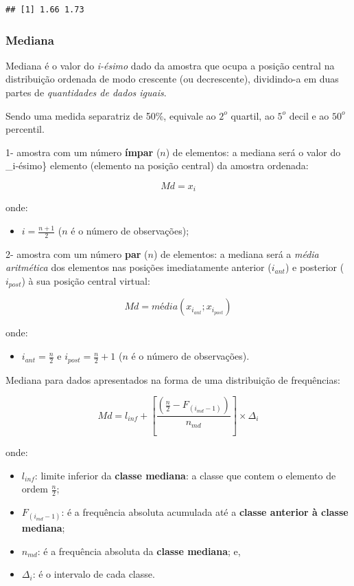 \documentclass[
]{book}
\providecommand{\tightlist}{%
  \setlength{\itemsep}{0pt}\setlength{\parskip}{0pt}}
\begin{document}
\begin{verbatim}
## [1] 1.66 1.73
\end{verbatim}

\hypertarget{mediana}{%
\subsubsection{Mediana}\label{mediana}}

Mediana é o valor do \emph{i-ésimo} dado da amostra que ocupa a posição central na distribuição ordenada de modo crescente (ou decrescente), dividindo-a em duas partes de \emph{quantidades de dados iguais}.

Sendo uma medida separatriz de 50\%, equivale ao \(2^{o}\) quartil, ao \(5^{o}\) decil e ao \(50^{o}\) percentil.

1- amostra com um número \textbf{ímpar} (\(n\)) de elementos: a mediana será o valor do \_i-ésimo\} elemento (elemento na posição central) da amostra ordenada:

\[
Md=x_{i} 
\]

onde:

\begin{itemize}
\tightlist
\item
  \(i=\frac{n+1}{2}\) (\(n\) é o número de observações);
\end{itemize}

2- amostra com um número \textbf{par} (\(n\)) de elementos: a mediana será a \emph{média aritmética} dos elementos nas posições imediatamente anterior (\(i_{ant}\)) e posterior (\(i_{post}\)) à sua posição central virtual:

\[
Md=média(x_{i_{ant}} ; x_{i_{post}})
\]

onde:

\begin{itemize}
\tightlist
\item
  \(i_{ant} = \frac{n}{2}\) e \(i_{post} =\frac{n}{2}+1\) (\(n\) é o número de observações).
\end{itemize}

Mediana para dados apresentados na forma de uma distribuição de frequências:

\[
Md = l_{inf} + [ \frac{(\frac{n}{2} -  F_{(i_{md}-1)})}{n_{md}} ]\times \Delta_{i}
\]

onde:

\begin{itemize}
\tightlist
\item
  \(l_{inf}\): limite inferior da \textbf{classe mediana}: a classe que contem o elemento de ordem \(\frac{n}{2}\);
\item
  \(F_{(i_{md}-1)}\): é a frequência absoluta acumulada até a \textbf{classe anterior à classe mediana};
\item
  \(n_{md}\): é a frequência absoluta da \textbf{classe mediana}; e,
\item
  \(\Delta_{i}\): é o intervalo de cada classe.
\end{itemize}
\end{document}
